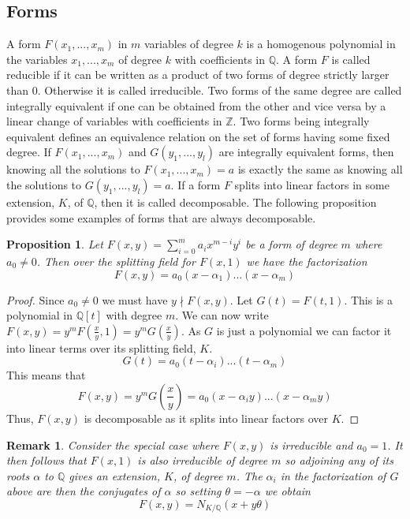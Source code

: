 \documentclass{article}
\newtheorem{proposition}{Proposition}[section]
\newtheorem{remark}{Remark}[section]
\newcommand{\mbb}[1]{\mathbb{#1}}
\numberwithin{equation}{section}
\begin{document}
\subsection{Forms}
A form $F(x_1, ..., x_m)$ in $m$ variables of degree $k$ is a homogenous polynomial in the variables $x_1, ..., x_m$ of degree $k$ with coefficients in $\mbb{Q}$. A form $F$ is called reducible if it can be written as a product of two forms of degree strictly larger than 0. Otherwise it is called irreducible. Two forms of the same degree are called integrally equivalent if one can be obtained from the other and vice versa by a linear change of variables with coefficients in $\mbb{Z}$. Two forms being integrally equivalent defines an equivalence relation on the set of forms having some fixed degree. If $F(x_1, ..., x_m)$ and $G(y_1, ..., y_l)$ are integrally equivalent forms, then knowing all the solutions to $F(x_1, ..., x_m) = a$ is exactly the same as knowing all the solutions to $G(y_1, ..., y_l) = a$. If a form $F$ splits into linear factors in some extension, $K$, of $\mbb{Q}$, then it is called decomposable.
The following proposition provides some examples of forms that are always decomposable.

\begin{proposition}\label{prop: Forms of two variables are decomposable}
	Let $F(x,y) = \sum_{i=0}^m a_i x^{m-i}y^{i}$ be a form of degree $m$ where $a_0 \neq 0$. Then over the splitting field for $F(x,1)$ we have the factorization
	$$F(x, y) = a_0(x - \alpha_1)...(x - \alpha_m)$$
\end{proposition}
\begin{proof}
	Since $a_0 \neq 0$ we must have $y \nmid F(x, y)$. Let $G(t) = F(t, 1)$. This is a polynomial in $\mbb Q[t]$ with degree $m$. We can now write
	$F(x, y) = y^mF(\frac{x}{y}, 1) = y^m G(\frac{x}{y})$. As $G$ is just a polynomial we can factor it into linear terms over its splitting field, $K$.
	$$G(t) = a_0 (t - \alpha_i) ... (t - \alpha_m)$$
	This means that
	$$F(x,y) = y^mG(\frac{x}{y}) =  a_0 (x - \alpha_iy) ... (x - \alpha_m y)$$
	Thus, $F(x,y)$ is decomposable as it splits into linear factors over $K$.
\end{proof}
\begin{remark}\label{remark: Forms of two variables are decomposable}
	Consider the special case where $F(x,y)$ is irreducible and $a_0 = 1$. It then follows that $F(x,1)$ is also irreducible of degree $m$ so adjoining any of its roots $\alpha$ to $\mbb Q$ gives an extension, $K$, of degree $m$. The $\alpha_i$ in the factorization of $G$ above are then the conjugates of $\alpha$ so setting $\theta = -\alpha$ we obtain
	$$F(x,y) = N_{K / \mbb Q}(x + y \theta)$$
\end{remark}
\end{document}
